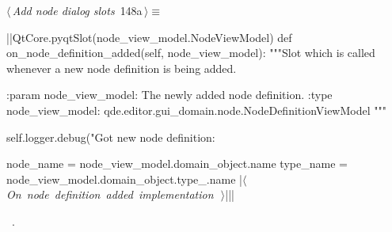 \documentclass[%
    a4paper,    %
    justified,  %
    nobib,      %
    openany     %
]{tufte-book}
\begin{document}
\begin{flushleft} \small
\begin{minipage}{\linewidth}\label{scrap153}\raggedright\small
{} $\langle\,${\itshape Add node dialog slots}\nobreak\ {\footnotesize {148a}}$\,\rangle\equiv$
\vspace{-1ex}
\begin{pythoncode}
|\normalfont{}\fontfamily{}|QtCore.pyqtSlot(node_view_model.NodeViewModel)
def on_node_definition_added(self, node_view_model):
    """Slot which is called whenever a new node definition is being added.

    :param node_view_model: The newly added node definition.
    :type  node_view_model: qde.editor.gui_domain.node.NodeDefinitionViewModel
    """

    self.logger.debug("Got new node definition: %

    node_name = node_view_model.domain_object.name
    type_name = node_view_model.domain_object.type_.name
    |\hbox{$\langle\,${\itshape On node definition added implementation}\nobreak\ {\footnotesize {}}$\,\rangle$}||\NWsep|
\end{pythoncode}
\vspace{1.5ex}
\footnotesize
\begin{list}{}{\setlength{\itemsep}{-\parsep}\setlength{\itemindent}{-\leftmargin}}
\item \NWtxtMacroRefIn\ .

\item{}
\end{list}
\end{minipage}\vspace{4ex}
\end{flushleft}
%
\end{document}
